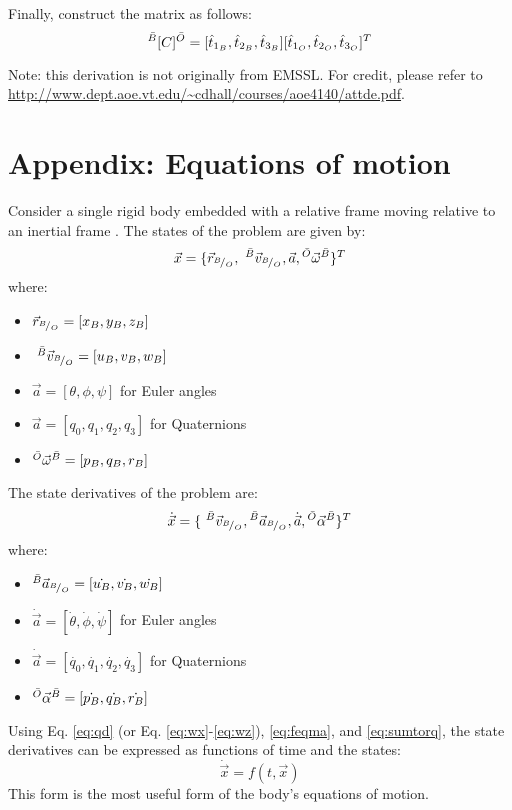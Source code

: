 \documentclass{article}
\begin{document}
Finally, construct the  matrix as follows:
\begin{equation}
     {}^{\bar{B}}\lbrack{C}\rbrack^{\bar{O}} = [\hat{t}_{1_B}, \hat{t}_{2_B}, \hat{t}_{3_B}][\hat{t}_{1_O}, \hat{t}_{2_O}, \hat{t}_{3_O}]^T
\end{equation}

Note: this derivation is not originally from EMSSL. For credit, please refer to \url{http://www.dept.aoe.vt.edu/~cdhall/courses/aoe4140/attde.pdf}. 




\newpage
\section*{Appendix: Equations of motion}
Consider a single rigid body embedded with a relative frame  moving relative to an inertial frame . The states of the problem are given by:
\begin{equation}
    \vec{x} = \{\vec{r}_{{}^{B}\!/_{O}}, \,\,^{\bar{B}}{\vec{v}}_{{}^{B}\!/_{O}}, \vec{a}, \,\,\!\!^{\bar{O}}\vec{\omega}^{\bar{B}}\}^{T}
\end{equation}
where:
\begin{itemize}
    \item $\vec{r}_{{}^{B}\!/_{O}} = [x_B, y_B, z_B]$
    \item $\,\,^{\bar{B}}{\vec{v}}_{{}^{B}\!/_{O}} = [u_B, v_B, w_B]$
    \item $\vec{a} = [\theta, \phi, \psi]$ for Euler angles
    \item $\vec{a} = [q_0, q_1, q_2, q_3]$ for Quaternions
    \item $\,\,\!\!^{\bar{O}}\vec{\omega}^{\bar{B}} = [p_B, q_B, r_B]$
\end{itemize}
The state derivatives of the problem are:
\begin{equation}
    \dot{\vec{x}} = \{\,\,^{\bar{B}}{\vec{v}}_{{}^{B}\!/_{O}},  {}^{\bar{B}}{\vec{a}}_{{}^{B}\!/_{O}}, \dot{\vec{a}}, {}^{\bar{O}}\vec{\alpha}^{\bar{B}}\}^{T}
\end{equation}
where:
\begin{itemize}
    \item $ {}^{\bar{B}}{\vec{a}}_{{}^{B}\!/_{O}} = [\dot{u_B}, \dot{v_B}, \dot{w_B}]$
    \item $\dot{\vec{a}} = [\dot{\theta}, \dot{\phi}, \dot{\psi}]$ for Euler angles
    \item $\dot{\vec{a}} = [\dot{q_0}, \dot{q_1}, \dot{q_2}, \dot{q_3}]$ for Quaternions
    \item ${}^{\bar{O}}\vec{\alpha}^{\bar{B}} = [\dot{p_B}, \dot{q_B}, \dot{r_B}]$
\end{itemize}
Using Eq. \ref{eq:qd} (or Eq. \ref{eq:wx}-\ref{eq:wz}), \ref{eq:feqma}, and \ref{eq:sumtorq}, the state derivatives can be expressed as functions of time and the states:
\begin{equation}
    \dot{\vec{x}} = f(t, \vec{x})
    \label{eq:xdofx}
\end{equation}
This form is the most useful form of the body's equations of motion. 
\end{document}

